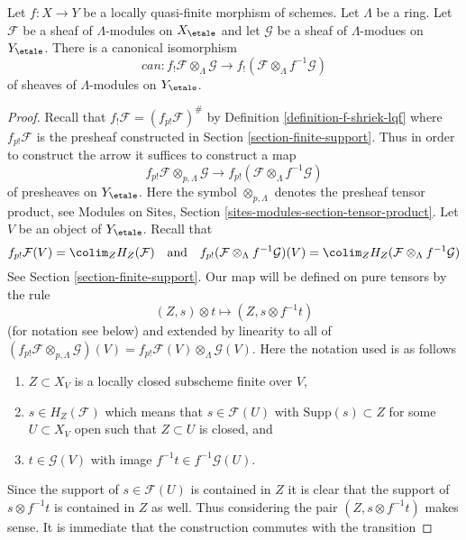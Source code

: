 \begin{lemma}
\label{lemma-f-shriek-projection}
Let $f : X \to Y$ be a locally quasi-finite morphism of schemes.
Let $\Lambda$ be a ring.
Let $\mathcal{F}$ be a sheaf of $\Lambda$-modules on $X_\etale$
and let $\mathcal{G}$ be a sheaf of $\Lambda$-modues on $Y_\etale$.
There is a canonical isomorphism
$$
can :
f_!\mathcal{F} \otimes_\Lambda \mathcal{G}
\longrightarrow
f_!(\mathcal{F} \otimes_\Lambda f^{-1}\mathcal{G})
$$
of sheaves of $\Lambda$-modules on $Y_\etale$.
\end{lemma}

\begin{proof}
Recall that $f_!\mathcal{F} = (f_{p!}\mathcal{F})^\#$
by Definition \ref{definition-f-shriek-lqf} where
$f_{p!}\mathcal{F}$ is the presheaf
constructed in Section \ref{section-finite-support}.
Thus in order to construct the arrow it suffices to construct a map
$$
f_{p!}\mathcal{F} \otimes_{p, \Lambda} \mathcal{G}
\longrightarrow
f_{p!}(\mathcal{F} \otimes_\Lambda f^{-1}\mathcal{G})
$$
of presheaves on $Y_\etale$. Here the symbol $\otimes_{p, \Lambda}$
denotes the presheaf tensor product, see
Modules on Sites, Section \ref{sites-modules-section-tensor-product}.
Let $V$ be an object of $Y_\etale$. Recall that
$$
f_{p!}\mathcal{F}(V) = \colim_Z H_Z(\mathcal{F})
\quad\text{and}\quad
f_{p!}(\mathcal{F} \otimes_\Lambda f^{-1}\mathcal{G})(V) =
\colim_Z H_Z(\mathcal{F} \otimes_\Lambda f^{-1}\mathcal{G})
$$
See Section \ref{section-finite-support}. Our map will be defined
on pure tensors by the rule
$$
(Z, s) \otimes t \longmapsto (Z, s \otimes f^{-1}t)
$$
(for notation see below) and extended by linearity to all of
$(f_{p!}\mathcal{F} \otimes_{p, \Lambda} \mathcal{G})(V) =
f_{p!}\mathcal{F}(V) \otimes_\Lambda \mathcal{G}(V)$.
Here the notation used is as follows
\begin{enumerate}
\item $Z \subset X_V$ is a locally closed subscheme finite over $V$,
\item $s \in H_Z(\mathcal{F})$ which means that $s \in \mathcal{F}(U)$
with $\text{Supp}(s) \subset Z$ for some $U \subset X_V$ open such that
$Z \subset U$ is closed, and
\item $t \in \mathcal{G}(V)$ with image $f^{-1}t \in f^{-1}\mathcal{G}(U)$.
\end{enumerate}
Since the support of $s \in \mathcal{F}(U)$ is contained in $Z$ it is clear
that the support of $s \otimes f^{-1}t$ is contained in $Z$ as well.
Thus considering the pair $(Z, s \otimes f^{-1}t)$ makes sense.
It is immediate that the construction commutes with the transition

\end{proof}

